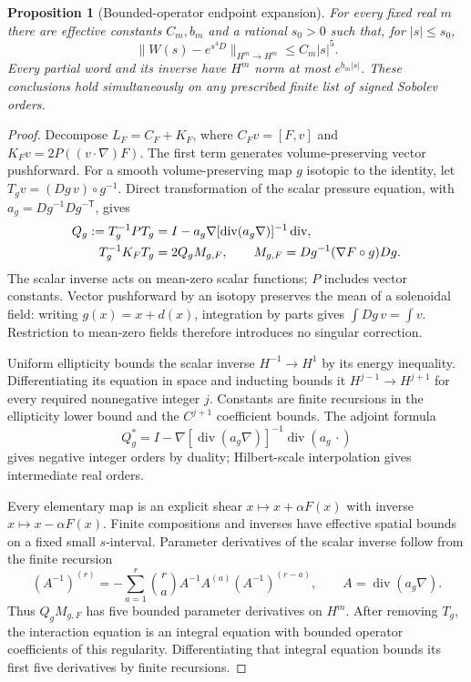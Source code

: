\documentclass[11pt,a4paper]{amsart}
\newtheorem{proposition}[theorem]{Proposition}
\theoremstyle{definition}
\theoremstyle{remark}
\numberwithin{equation}{section}
\begin{document}
\begin{proposition}[Bounded-operator endpoint expansion]\label{fnd:operator}
For every fixed real $m$ there are effective constants $C_m,b_m$ and a rational
$s_0>0$ such that, for $|s|\le s_0$,
\begin{equation}
 \|W(s)-e^{s^4D}\|_{H^m\to H^m}\le C_m|s|^5.
 \label{fnd:operator-taylor}
\end{equation}
Every partial word and its inverse have $H^m$ norm at most $e^{b_m|s|}$.
These conclusions hold simultaneously on any prescribed finite list of signed
Sobolev orders.
\end{proposition}
\begin{proof}
Decompose $L_F=C_F+K_F$, where $C_Fv=[F,v]$ and
$K_Fv=2P((v\cdot\nabla)F)$. The first term generates volume-preserving vector
pushforward. For a smooth volume-preserving map $g$ isotopic to the identity,
let $T_gv=(Dg\,v)\circ g^{-1}$. Direct transformation of the scalar pressure
equation, with $a_g=Dg^{-1}Dg^{-\mathsf T}$, gives
\begin{align}
 Q_g:=T_g^{-1}PT_g
 &=I-a_g\nabla[\operatorname{div}(a_g\nabla)]^{-1}\operatorname{div},\notag\\
 T_g^{-1}K_FT_g&=2Q_gM_{g,F},\qquad
 M_{g,F}=Dg^{-1}(\nabla F\circ g)Dg.
 \label{fnd:pressure-conjugation}
\end{align}
The scalar inverse acts on mean-zero scalar functions; $P$ includes vector
constants. Vector pushforward by an isotopy preserves the mean of a solenoidal
field: writing $g(x)=x+d(x)$, integration by parts gives
$\int Dg\,v=\int v$. Restriction to mean-zero fields therefore introduces no
singular correction.

Uniform ellipticity bounds the scalar inverse $H^{-1}\to H^1$ by its energy
inequality. Differentiating its equation in space and inducting bounds it
$H^{j-1}\to H^{j+1}$ for every required nonnegative integer $j$. Constants are
finite recursions in the ellipticity lower bound and the $C^{j+1}$ coefficient
bounds. The adjoint formula
\[
 Q_g^*=I-\nabla[\operatorname{div}(a_g\nabla)]^{-1}
                            \operatorname{div}(a_g\,\cdot)
\]
gives negative integer orders by duality; Hilbert-scale interpolation gives
intermediate real orders.

Every elementary map is an explicit shear $x\mapsto x+\alpha F(x)$ with inverse
$x\mapsto x-\alpha F(x)$. Finite compositions and inverses have effective
spatial bounds on a fixed small $s$-interval. Parameter derivatives of the
scalar inverse follow from the finite recursion
\[
 (A^{-1})^{(r)}=-\sum_{a=1}^r\binom ra
           A^{-1}A^{(a)}(A^{-1})^{(r-a)},\qquad
 A=\operatorname{div}(a_g\nabla).
\]
Thus $Q_gM_{g,F}$ has five bounded parameter derivatives on $H^m$. After
removing $T_g$, the interaction equation is an integral equation with bounded
operator coefficients of this regularity. Differentiating that integral
equation bounds its first five derivatives by finite recursions.


\end{proof}
\end{document}
